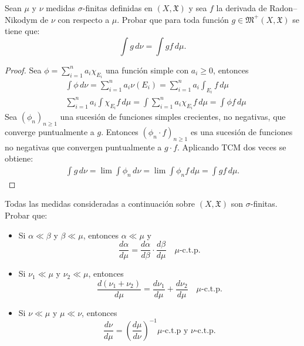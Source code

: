 \documentclass[12pt]{article}
\newenvironment{statement}[2][Ejercicio]{\begin{trivlist}
\item[\hskip \labelsep {\bfseries #1}\hskip \labelsep {\bfseries #2.}]}{\end{trivlist}}
\begin{document}
\begin{statement}{7}
    Sean $\mu$ y $\nu$ medidas $\sigma$-finitas definidas en $(X, \mathfrak{X})$ y sea $f$ la derivada de Radon–Nikodym de $\nu$ con respecto a $\mu$. Probar que para toda función $g \in \mathfrak{M}^+(X, \mathfrak{X})$ se tiene que:
    \[
        \int g \, d\nu = \int gf \, d\mu.
    \]
\end{statement}

\begin{proof}
    Sea $\phi = \sum_{i = 1}^n a_i \chi_{E_i}$ una función simple con $a_i \geq 0$, entonces \begin{align*}
         & \int \phi \, d\nu = \sum_{i = 1}^n a_i \nu(E_i) = \sum_{i = 1}^n a_i \int_{E_i} f \, d\mu                         \\
         & \sum_{i = 1}^n a_i \int \chi_{E_i} f \, d\mu = \int \sum_{i = 1}^n a_i \chi_{E_i} f \, d\mu = \int \phi f \, d\mu
    \end{align*}
    Sea $(\phi_n)_{n \geq 1}$ una sucesión de funciones simples crecientes, no negativas, que converge puntualmente a $g$. Entonces $(\phi_n \cdot f)_{n \geq 1}$ es una sucesión
    de funciones no negativas que convergen puntualmente a $g \cdot f$. Aplicando TCM dos veces se obtiene: \begin{align*}
        \int g \, d \nu = \lim \int \phi_n \, d \nu = \lim \int \phi_n f \, d\mu = \int g f \, d\mu.
    \end{align*}
\end{proof}

\begin{statement}{8}
    Todas las medidas consideradas a continuación sobre $(X, \mathfrak{X})$ son $\sigma$-finitas. Probar que:

    \begin{itemize}
        \item[(a)] Si $\alpha \ll \beta$ y $\beta \ll \mu$, entonces $\alpha \ll \mu$ y
              \[
                  \frac{d\alpha}{d\mu} = \frac{d\alpha}{d\beta} \cdot \frac{d\beta}{d\mu} \quad \mu\text{-c.t.p.}
              \]
        \item[(b)] Si $\nu_1 \ll \mu$ y $\nu_2 \ll \mu$, entonces
              \[
                  \frac{d(\nu_1 + \nu_2)}{d\mu} = \frac{d\nu_1}{d\mu} + \frac{d\nu_2}{d\mu} \quad \mu\text{-c.t.p.}
              \]
        \item[(c)] Si $\nu \ll \mu$ y $\mu \ll \nu$, entonces
              \[
                  \frac{d\nu}{d\mu} = \left( \frac{d\mu}{d\nu} \right)^{-1} \mu\text{-c.t.p y } \nu\text{-c.t.p.}
              \]
    \end{itemize}
\end{statement}
\end{document}
